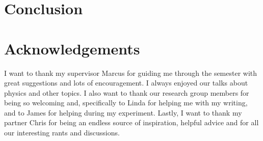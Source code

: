 \documentclass[10pt, a4paper, singlespacing]{report}
\begin{document}
\chapter{Conclusion}\label{Conclusion}




\chapter{Acknowledgements}\label{Acknowledgements}

I want to thank my supervisor Marcus for guiding me through the semester with great suggestions and lots of encouragement. I always enjoyed our talks about physics and other topics. I also want to thank our research group members for being so welcoming and, specifically to Linda for helping me with my writing, and to James for helping during my experiment. Lastly, I want to thank my partner Chris for being an endless source of inspiration, helpful advice and for all our interesting rants and discussions.  




\end{document}
